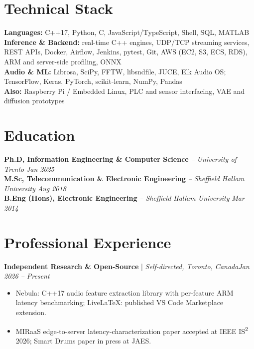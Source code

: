 \documentclass[11pt]{article}
\newenvironment{cvrole}[5]{%
  \par\noindent\textbf{\large #1} | \textit{\small #2, #3}\hfill \textit{\small #4 -- #5}\par
  \begin{itemize}[leftmargin=2em, itemsep=-0.3em, topsep=-0.5em]%
}{%
  \end{itemize}\par\noindent\mbox{}\par\vspace{0.1em}%
}
\begin{document}
\section*{Technical Stack}

\textbf{Languages:} C++17, Python, C, JavaScript/TypeScript, Shell, SQL, MATLAB\\
\textbf{Inference \& Backend:} real-time C++ engines, UDP/TCP streaming services, REST APIs, Docker, Airflow, Jenkins, pytest, Git, AWS (EC2, S3, ECS, RDS), ARM and server-side profiling, ONNX\\
\textbf{Audio \& ML:} Librosa, SciPy, FFTW, libsndfile, JUCE, Elk Audio OS; TensorFlow, Keras, PyTorch, scikit-learn, NumPy, Pandas\\
\textbf{Also:} Raspberry Pi / Embedded Linux, PLC and sensor interfacing, VAE and diffusion prototypes

\section*{Education}
\textbf{Ph.D, Information Engineering \& Computer Science} \textit{\small{-- University of Trento}} \hfill \textit{Jan 2025}\\[2pt]
\noindent\textbf{M.Sc, Telecommunication \& Electronic Engineering} \textit{\small{-- Sheffield Hallam University}} \hfill \textit{Aug 2018}\\[2pt]
\noindent\textbf{B.Eng (Hons), Electronic Engineering} \textit{\small{-- Sheffield Hallam University}} \hfill \textit{Mar 2014}

\section*{Professional Experience}

\begin{cvrole}{Independent Research \& Open-Source}{Self-directed}{Toronto, Canada}{Jan 2026}{Present}
    \item Nebula: C++17 audio feature extraction library with per-feature ARM latency benchmarking; LiveLaTeX: published VS Code Marketplace extension.
    \item MIRaaS edge-to-server latency-characterization paper accepted at IEEE IS\textsuperscript{2} 2026; Smart Drums paper in press at JAES.
\end{cvrole}
\end{document}
